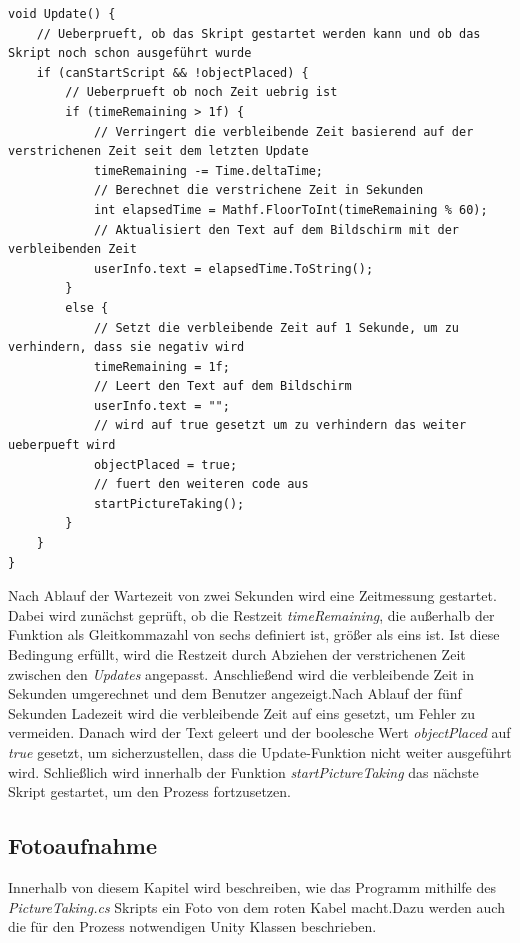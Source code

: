 \begin{lstlisting}[style=csharp, caption={Update des \textit{CableSearch} Skripts}, label=code:Timer]
void Update() {
    // Ueberprueft, ob das Skript gestartet werden kann und ob das Skript noch schon ausgeführt wurde
    if (canStartScript && !objectPlaced) {
        // Ueberprueft ob noch Zeit uebrig ist
        if (timeRemaining > 1f) {
            // Verringert die verbleibende Zeit basierend auf der verstrichenen Zeit seit dem letzten Update
            timeRemaining -= Time.deltaTime;
            // Berechnet die verstrichene Zeit in Sekunden
            int elapsedTime = Mathf.FloorToInt(timeRemaining % 60);
            // Aktualisiert den Text auf dem Bildschirm mit der verbleibenden Zeit
            userInfo.text = elapsedTime.ToString();
        }
        else {
            // Setzt die verbleibende Zeit auf 1 Sekunde, um zu verhindern, dass sie negativ wird
            timeRemaining = 1f;
            // Leert den Text auf dem Bildschirm
            userInfo.text = "";
            // wird auf true gesetzt um zu verhindern das weiter ueberpueft wird
            objectPlaced = true;
            // fuert den weiteren code aus
            startPictureTaking();
        }
    }
}
\end{lstlisting}
Nach Ablauf der Wartezeit von zwei Sekunden wird eine Zeitmessung gestartet. Dabei wird zunächst geprüft, ob die Restzeit \textit{timeRemaining}, die außerhalb der Funktion als Gleitkommazahl von sechs definiert ist, größer als eins ist. Ist diese Bedingung erfüllt, wird die Restzeit durch Abziehen der verstrichenen Zeit zwischen den \textit{Updates} angepasst. Anschließend wird die verbleibende Zeit in Sekunden umgerechnet und dem Benutzer angezeigt.Nach Ablauf der fünf Sekunden Ladezeit wird die verbleibende Zeit auf eins gesetzt, um Fehler zu vermeiden. Danach wird der Text geleert und der boolesche Wert \textit{objectPlaced} auf \textit{true} gesetzt, um sicherzustellen, dass die Update-Funktion nicht weiter ausgeführt wird. Schließlich wird innerhalb der Funktion \textit{startPictureTaking} das nächste Skript gestartet, um den Prozess fortzusetzen.

\subsection{\label{sec:Fotoaufnahme}Fotoaufnahme}
Innerhalb von diesem Kapitel wird beschreiben, wie das Programm mithilfe des \textit{PictureTaking.cs} Skripts ein Foto von dem roten Kabel macht.Dazu werden auch die für den Prozess notwendigen Unity Klassen beschrieben.

